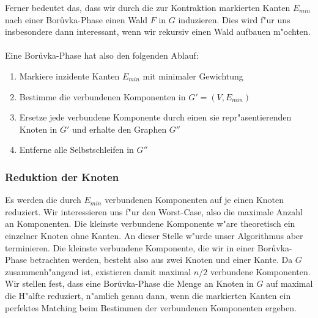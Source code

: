 Ferner bedeutet das, dass wir durch die zur Kontraktion markierten Kanten
    $E_{min}$ nach einer Bor\r uvka-Phase einen Wald $F$ in $G$ induzieren.
    Dies wird f"ur uns insbesondere dann interessant, wenn
    wir rekursiv einen Wald aufbauen m"ochten.\\
\\
Eine Bor\r uvka-Phase hat also den folgenden Ablauf:
\begin{enumerate}
    \item Markiere inzidente Kanten $E_{min}$ mit minimaler Gewichtung
    \item Bestimme die verbundenen Komponenten in $G' = (V,E_{min})$
    \item Ersetze jede verbundene Komponente durch einen sie repr"asentierenden
          Knoten in $G'$ und erhalte den Graphen $G''$
    \item Entferne alle Selbstschleifen in $G''$
\end{enumerate}

\subsubsection{Reduktion der Knoten}
Es werden die durch $E_{min}$ verbundenen Komponenten auf je einen Knoten 
    reduziert.
    Wir interessieren uns f"ur den Worst-Case, also die maximale Anzahl an 
    Komponenten.
    Die kleinste verbundene Komponente w"are theoretisch ein
    einzelner Knoten ohne Kanten.
    An dieser Stelle w"urde unser Algorithmus aber terminieren.
    Die kleinste verbundene Komponente, die wir in einer Bor\r uvka-Phase 
    betrachten werden, besteht also aus zwei Knoten und einer Kante.
    Da $G$ zusammenh"angend ist, existieren damit maximal $n/2$ verbundene
    Komponenten.\\
Wir stellen fest, dass eine Bor\r uvka-Phase die Menge an Knoten in $G$ auf 
    maximal die H"alfte reduziert, n"amlich genau dann, wenn die markierten 
    Kanten ein perfektes Matching beim Bestimmen der verbundenen Komponenten
    ergeben.\\
